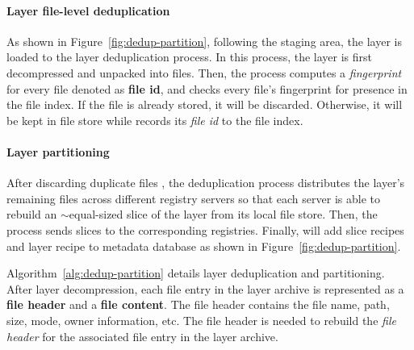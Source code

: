 \paragraph{Layer file-level deduplication}
As shown in Figure~\ref{fig:dedup-partition}, 
following the staging area, the layer is loaded to the layer deduplication process.
In this process, the layer is first decompressed and unpacked into files.
Then, 
the process computes a \emph{fingerprint} for every file denoted as \textbf{file id}, 
and checks every file's fingerprint for presence in the file index.
If the file is already stored, it will be discarded. 
Otherwise, it will be kept in file store while
\sysname records its \emph{file id} to the file index.
\paragraph{Layer partitioning}
After discarding duplicate files%
, the deduplication process distributes the layer's remaining files across different registry servers
so that each server is able to rebuild an $\sim$equal-sized slice of the layer from its local file store.
Then, the process sends slices to the corresponding registries.
Finally, \sysname will add slice recipes and layer recipe to metadata database as shown in Figure~\ref{fig:dedup-partition}.



Algorithm~\ref{alg:dedup-partition} details layer deduplication and partitioning.
After layer decompression, 
each file entry in the layer archive is represented as a \textbf{file header} and a \textbf{file content}.
The file header contains the file name, path, size, mode, owner information, etc.
The file header is needed to rebuild the \emph{file header} for 
the associated file entry in the layer archive.

